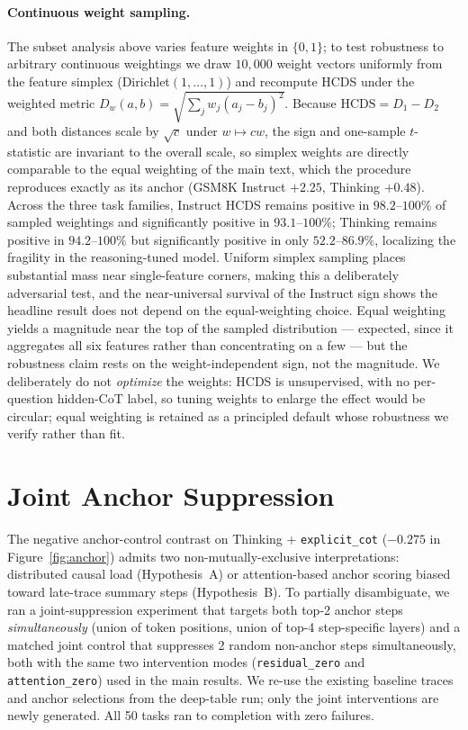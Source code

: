 \documentclass{article}
\theoremstyle{plain}
\theoremstyle{definition}
\theoremstyle{remark}
\begin{document}
\paragraph{Continuous weight sampling.} The subset analysis above
varies feature weights in $\{0,1\}$; to test robustness to arbitrary
continuous weightings we draw $10{,}000$ weight vectors uniformly from
the feature simplex (Dirichlet$(1,\dots,1)$) and recompute HCDS under
the weighted metric $D_w(a,b)=\sqrt{\sum_j w_j (a_j-b_j)^2}$. Because
$\mathrm{HCDS}=D_1-D_2$ and both distances scale by $\sqrt{c}$ under
$w\mapsto cw$, the sign and one-sample $t$-statistic are invariant to
the overall scale, so simplex weights are directly comparable to the
equal weighting of the main text, which the procedure reproduces
exactly as its anchor (GSM8K Instruct $+2.25$, Thinking $+0.48$).
Across the three task families, Instruct HCDS remains positive in
$98.2$--$100\%$ of sampled weightings and significantly positive in
$93.1$--$100\%$; Thinking remains positive in $94.2$--$100\%$ but
significantly positive in only $52.2$--$86.9\%$, localizing the
fragility in the reasoning-tuned model. Uniform simplex sampling places
substantial mass near single-feature corners, making this a
deliberately adversarial test, and the near-universal survival of the
Instruct sign shows the headline result does not depend on the
equal-weighting choice. Equal weighting yields a magnitude near the top
of the sampled distribution --- expected, since it aggregates all six
features rather than concentrating on a few --- but the robustness
claim rests on the weight-independent sign, not the magnitude. We
deliberately do not \emph{optimize} the weights: HCDS is unsupervised,
with no per-question hidden-CoT label, so tuning weights to enlarge the
effect would be circular; equal weighting is retained as a principled
default whose robustness we verify rather than fit.

\section{Joint Anchor Suppression}
\label{app:joint-anchor}

The negative anchor-control contrast on Thinking + \texttt{explicit\_cot}
($-0.275$ in Figure~\ref{fig:anchor}) admits two non-mutually-exclusive
interpretations: distributed causal load (Hypothesis~A) or
attention-based anchor scoring biased toward late-trace summary steps
(Hypothesis~B). To partially disambiguate, we ran a joint-suppression
experiment that targets both top-2 anchor steps \emph{simultaneously}
(union of token positions, union of top-4 step-specific layers) and a
matched joint control that suppresses 2 random non-anchor steps
simultaneously, both with the same two intervention modes
(\texttt{residual\_zero} and \texttt{attention\_zero}) used in the main
results. We re-use the existing baseline traces and anchor selections
from the deep-table run; only the joint interventions are newly
generated. All 50 tasks ran to completion with zero failures.
\end{document}
